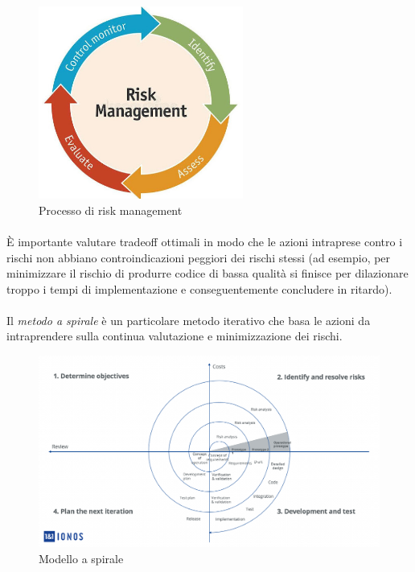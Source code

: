 \documentclass[11pt,a4paper,english]{article}
\begin{document}
\begin{figure}[H]
    \centering
    \includegraphics[width=0.6\textwidth]{img/risk_management.jpg}
    \caption{Processo di risk management}
\end{figure}

\paragraph{} È importante valutare tradeoff ottimali in modo che le azioni intraprese contro i rischi non abbiano controindicazioni peggiori dei rischi stessi (ad esempio, per minimizzare il rischio di produrre codice di bassa qualità si finisce per dilazionare troppo i tempi di implementazione e conseguentemente concludere in ritardo). 

\paragraph{} Il \emph{metodo a spirale} è un particolare metodo iterativo che basa le azioni da intraprendere sulla continua valutazione e minimizzazione dei rischi. 

\begin{figure}[H]
    \centering
    \includegraphics[width=1\textwidth]{img/modello_spirale.png}
    \caption{Modello a spirale}
\end{figure}
\end{document}

